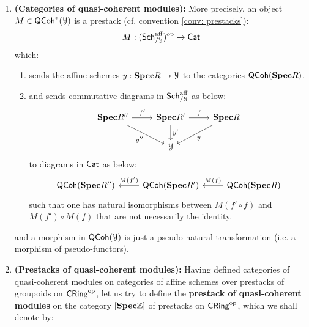 \begin{definition}
\begin{enumerate}
                        \item \textbf{(Categories of quasi-coherent modules):} More precisely, an object $M \in \mathsf{QCoh}^*(\mathcal{Y})$ is a prestack (cf. convention \ref{conv: prestacks}):
                            $$M: (\mathsf{Sch}^{\mathrm{aff}}_{/\mathcal{Y}})^{\mathrm{op}} \to \mathsf{Cat}$$
                        which:
                            \begin{enumerate}
                                \item sends the affine schemes $y: \mathbf{Spec} R \to \mathcal{Y}$ to the categories $\mathsf{QCoh}(\mathbf{Spec} R)$.
                                \item and sends commutative diagrams in $\mathsf{Sch}^{\mathrm{aff}}_{/\mathcal{Y}}$ as below:
                                    $$
                                        \begin{tikzcd}
                                        	{\Spec R''} & {\Spec R'} & {\Spec R} \\
                                        	& \calY
                                        	\arrow["{y''}"', from=1-1, to=2-2]
                                        	\arrow["{y'}", from=1-2, to=2-2]
                                        	\arrow["{f'}", from=1-1, to=1-2]
                                        	\arrow["y", from=1-3, to=2-2]
                                        	\arrow["f", from=1-2, to=1-3]
                                        \end{tikzcd}
                                    $$
                                to diagrams in $\mathsf{Cat}$ as below:
                                    $$
                                        \begin{tikzcd}
                                        	{\QCoh(\Spec R'')} & {\QCoh(\Spec R')} & {\QCoh(\Spec R)}
                                        	\arrow["{M(f')}"', from=1-2, to=1-1]
                                        	\arrow["{M(f)}"', from=1-3, to=1-2]
                                        \end{tikzcd}
                                    $$
                                such that one has natural isomorphisms between $M(f' \circ f)$ and $M(f') \circ M(f)$ that are not necessarily the identity.
                            \end{enumerate}
                        and a morphism in $\mathsf{QCoh}(\mathcal{Y})$ is just a \href{https://ncatlab.org/nlab/show/pseudonatural+transformation}{\underline{pseudo-natural transformation}} (i.e. a morphism of pseudo-functors).
                        \item \textbf{(Prestacks of quasi-coherent modules):} Having defined categories of quasi-coherent modules on categories of affine schemes over prestacks of groupoids on $\mathsf{CRing}^{\mathrm{op}}$, let us try to define the \textbf{prestack of quasi-coherent modules} on the category $[\mathbf{Spec} \mathbb{Z}]$ of prestacks on $\mathsf{CRing}^{\mathrm{op}}$, which we shall denote by:

\end{enumerate}
\end{definition}
